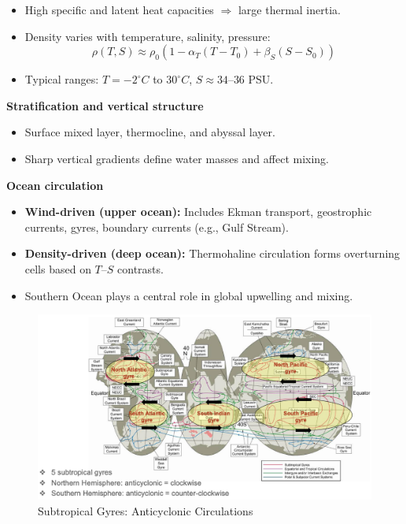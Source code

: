 \documentclass[fontsize=8pt, a4paper, landscape, fleqn]{scrartcl}
\renewcommand{\subsection}[1]{%
    \noindent\colorbox{subsectioncolor}{%
        \parbox{\dimexpr\columnwidth-2\fboxsep}{\color{white}\textbf{#1}}}%
    \vspace{0.5mm}%
}
\begin{document}
\begin{multicols*}{3}[\raggedcolumns]
\begin{itemize}
    \item High specific and latent heat capacities $\Rightarrow$ large thermal inertia.
    \item Density varies with temperature, salinity, pressure:
    \[
    \rho(T,S) \approx \rho_0(1 - \alpha_T(T - T_0) + \beta_S(S - S_0))
    \]
    \item Typical ranges: $T = -2^\circ C$ to $30^\circ C$, $S \approx 34$–$36$ PSU.
\end{itemize}

\subsection{Stratification and vertical structure}
\begin{itemize}
    \item Surface mixed layer, thermocline, and abyssal layer.
    \item Sharp vertical gradients define water masses and affect mixing.
\end{itemize}

\subsection{Ocean circulation}
\begin{itemize}
    \item \textbf{Wind-driven (upper ocean):} Includes Ekman transport, geostrophic currents, gyres, boundary currents (e.g., Gulf Stream).
    \item \textbf{Density-driven (deep ocean):} Thermohaline circulation forms overturning cells based on $T$–$S$ contrasts.
    \item Southern Ocean plays a central role in global upwelling and mixing.
\end{itemize}


\begin{figure}[H]
    \centering
    \includegraphics[width=0.9\linewidth]{CS/img/Subtropical_Gyres.png}
    \caption{Subtropical Gyres: Anticyclonic Circulations}
\end{figure}



\end{multicols*}
\end{document}
